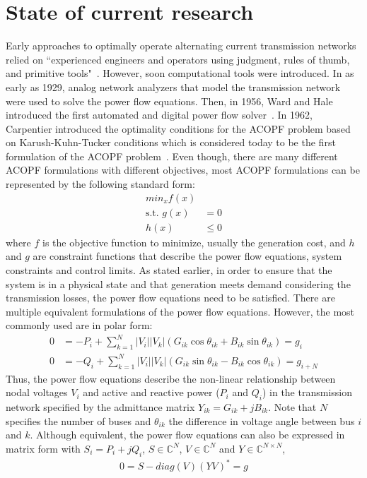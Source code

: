 \documentclass[11pt]{cmuthesis} %
\begin{document}
\section{State of current research}

Early approaches to optimally operate alternating current transmission networks relied on ``experienced engineers and operators using judgment, rules of thumb, and primitive tools"~\cite{cain2012history}. However, soon computational tools were introduced. In as early as 1929, analog network analyzers that model the transmission network were used to solve the power flow equations. Then, in 1956, Ward and Hale introduced the first automated and digital power flow solver~\cite{hale1956digital}. In 1962, Carpentier introduced the optimality conditions for the ACOPF problem based on Karush-Kuhn-Tucker conditions which is considered today to be the first formulation of the ACOPF problem~\cite{carpentier1962contribution}. Even though, there are many different ACOPF formulations with different objectives, most ACOPF formulations can be represented by the following standard form:
\begin{align*}
min_x f(x)\\
\text{s.t. } g(x) &= 0\\
h(x) &\leq 0
\end{align*}
where $f$ is the objective function to minimize, usually the generation cost, and $h$ and $g$ are constraint functions that describe the power flow equations, system constraints and control limits. As stated earlier, in order to ensure that the system is in a physical state and that generation meets demand considering the transmission losses, the power flow equations need to be satisfied. There are multiple equivalent formulations of the power flow equations. However, the most commonly used are in polar form:
\begin{align*}
0&=-P_{{i}}+\sum _{{k=1}}^{N}|V_{i}||V_{k}|(G_{{ik}}\cos \theta _{{ik}}+B_{{ik}}\sin \theta _{{ik}}) = g_i\\
0&=-Q_{{i}}+\sum _{{k=1}}^{N}|V_{i}||V_{k}|(G_{{ik}}\sin \theta _{{ik}}-B_{{ik}}\cos \theta _{{ik}}) = g_{i+N}
\end{align*}
Thus, the power flow equations describe the non-linear relationship between nodal voltages $V_i$ and active and reactive power ($P_i$ and $Q_i$) in the transmission network specified by the admittance matrix $Y_{ik} = G_{ik} + jB_{ik}$. Note that $N$ specifies the number of buses and $\theta _{{ik}}$ the difference in voltage angle between bus $i$ and $k$. Although equivalent, the power flow equations can also be expressed in matrix form with $S_i = P_i + jQ_i$, $S \in \mathbb{C}^N$, $V \in \mathbb{C}^N$ and $Y \in \mathbb{C}^{N \times N}$,
\begin{align*}
0 = S - diag(V)(YV)^* = g
\end{align*}
\end{document}
